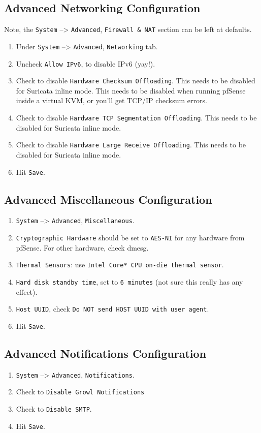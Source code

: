 \subsection{Advanced Networking Configuration}
Note, the \texttt{System} --> \texttt{Advanced}, \texttt{Firewall \& NAT} section can be left at defaults.

\begin{enumerate}
 \item Under \texttt{System} --> \texttt{Advanced}, \texttt{Networking} tab.
 \item Uncheck \texttt{Allow IPv6}, to disable IPv6 (yay!).
 \item Check to disable \texttt{Hardware Checksum Offloading}. This needs to be disabled for Suricata inline mode. This needs to be disabled when running pfSense inside a virtual KVM, or you'll get TCP/IP checksum errors.
 \item Check to disable \texttt{Hardware TCP Segmentation Offloading}. This needs to be disabled for Suricata inline mode.
 \item Check to disable \texttt{Hardware Large Receive Offloading}. This needs to be disabled for Suricata inline mode.
 \item Hit \texttt{Save}.
\end{enumerate}

\subsection{Advanced Miscellaneous Configuration}
\begin{enumerate}
 \item \texttt{System} --> \texttt{Advanced}, \texttt{Miscellaneous}.
 \item \texttt{Cryptographic Hardware} should be set to \texttt{AES-NI} for any hardware from pfSense. For other hardware, check dmesg.
 \item \texttt{Thermal Sensors}: use \texttt{Intel Core* CPU on-die thermal sensor}.
 \item \texttt{Hard disk standby time}, set to \texttt{6 minutes} (not sure this really has any effect).
 \item \texttt{Host UUID}, check \texttt{Do NOT send HOST UUID with user agent}.
 \item Hit \texttt{Save}.
\end{enumerate}

\subsection{Advanced Notifications Configuration}
\begin{enumerate}
 \item \texttt{System} --> \texttt{Advanced}, \texttt{Notifications}.
 \item Check to \texttt{Disable Growl Notifications}
 \item Check to \texttt{Disable SMTP}.
 \item Hit \texttt{Save}.
\end{enumerate}

